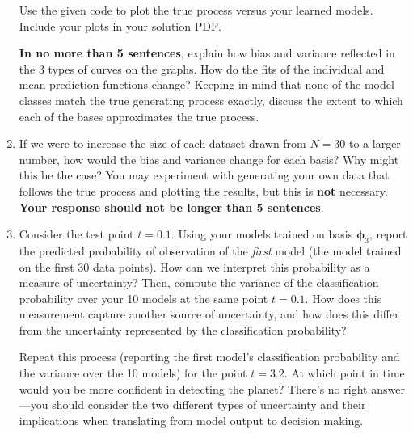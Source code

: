 \documentclass[submit]{harvardml}
\begin{document}
\begin{problem}
\begin{enumerate}
Use the given code to plot the true process versus your learned models. Include your plots in your solution PDF.

\textbf{In no more than 5 sentences}, explain how bias and variance reflected in the 3 types of curves on the graphs.  How do the fits of the individual and mean prediction functions change?  Keeping in mind that none of the model classes match the true generating process exactly, discuss the extent to which each of the bases approximates the true process.

\item If we were to increase the size of each dataset drawn from $N = 30$ to a larger number, how would the bias and variance change for each basis? Why might this be the case? You may experiment with generating your own data that follows the true process and plotting the results, but this is \textbf{not} necessary. \textbf{Your response should not be longer than 5 sentences}.

\item Consider the test point $t = 0.1$. Using your models trained on basis $\boldsymbol\phi_3$, report the predicted probability of observation of the \textit{first} model (the model trained on the first 30 data points). How can we interpret this probability as a measure of uncertainty? Then, compute the variance of the classification probability over your 10 models at the same point $t = 0.1$. How does this measurement capture another source of uncertainty, and how does this differ from the uncertainty represented by the classification probability?

Repeat this process (reporting the first model's classification probability and the variance over the 10 models) for the point $t = 3.2$. At which point in time would you be more confident in detecting the planet? There's no right answer---you should consider the two different types of uncertainty and their implications when translating from model output to decision making. 
\end{enumerate}
\end{problem}
 \let\cleardoublepage\clearpage
\newpage
\end{document}
